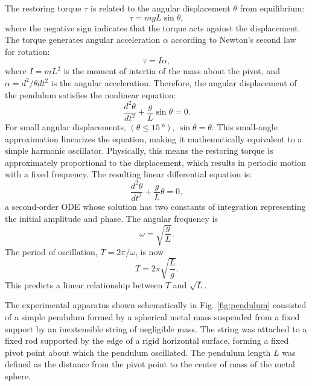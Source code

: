 \documentclass[rc]{physicsinprogress}
\begin{document}
The restoring torque $\tau$ is related to the angular displacement $\theta$ from equilibrium:
\begin{equation}
\tau=mgL\sin\theta,
\end{equation}
where the negative sign indicates that the torque acts against the displacement. The torque generates angular acceleration $\alpha$ according to Newton’s second law for rotation:
\begin{equation}
\tau=I\alpha,
\end{equation}
where $I=mL^2$ is the moment of intertia of the mass about the pivot, and $\alpha=d^2/\theta dt^2$ is the angular acceleration. Therefore, the angular displacement of the pendulum satisfies the nonlinear equation: 
\begin{equation}
\frac{d^2\theta}{dt^2}+\frac{g}{L}\sin\theta=0.
\end{equation}
For small angular displacements, $(\theta \leq \SI{15}{\degree})$, $\sin\theta=\theta$. This small-angle approximation linearizes the equation, making it mathematically equivalent to a simple harmonic oscillator. Physically, this means the restoring torque is approximately proportional to the displacement, which results in periodic motion with a fixed frequency. The resulting linear differential equation is:
\begin{equation}
\frac{d^2\theta}{dt^2}+\frac{g}{L}\theta=0,
\end{equation}
a second-order ODE whose solution has two constants of integration representing the initial amplitude and phase. The angular frequency is
\begin{equation}
\omega=\sqrt{\frac{g}{L}}.
\end{equation}
The period of oscillation, $T=2\pi/\omega$, is now
\begin{equation}
T=2\pi\sqrt{\frac{L}{g}}.
\end{equation}
This predicts a linear relationship between $T$ and $\sqrt{L}$.



The experimental apparatus shown schematically in Fig. \ref{fig:pendulum} consisted of a simple pendulum formed by a spherical metal mass suspended from a fixed support by an inextensible string of negligible mass. The string was attached to a fixed rod supported by the edge of a rigid horizontal surface, forming a fixed pivot point about which the pendulum oscillated. The pendulum length $L$ was defined as the distance from the pivot point to the center of mass of the metal sphere. 
\end{document}
